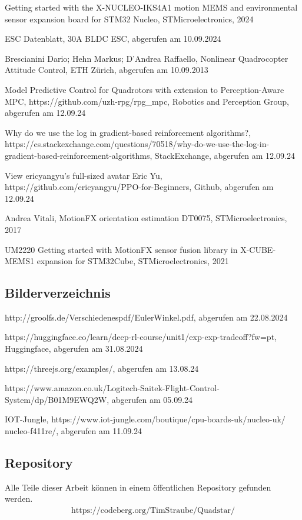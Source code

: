 \begin{enumerate}[label=\textbf{[\arabic*]}]
	\item \label{link:34} Getting started with the X-NUCLEO-IKS4A1 motion MEMS and environmental sensor expansion board for STM32 Nucleo, STMicroelectronics, 2024
	\item \label{link:Treiberdatenblatt}ESC Datenblatt, 30A BLDC ESC, abgerufen am 10.09.2024 
	\item \label{link:ETH}Brescianini Dario; Hehn Markus; D'Andrea Raffaello, Nonlinear Quadrocopter Attitude Control, ETH Zürich, abgerufen am 10.09.2013 
	\item \label{link:MPC} Model Predictive Control for Quadrotors with extension to Perception-Aware MPC, https://github.com/uzh-rpg/rpg\_mpc, Robotics and Perception Group, abgerufen am 12.09.24
	\item \label{link:LogPPO} Why do we use the log in gradient-based reinforcement algorithms?,\\ https://cs.stackexchange.com/questions/70518/why-do-we-use-the-log-in-gradient-based-reinforcement-algorithms, StackExchange, abgerufen am 12.09.24
	\item \label{link:PPOBeginner}View ericyangyu's full-sized avatar Eric Yu, https://github.com/ericyangyu/PPO-for-Beginners, Github, abgerufen am 12.09.24
	\item \label{link:MotionFX}Andrea Vitali, MotionFX orientation estimation DT0075, STMicroelectronics, 2017
	\item \label{X-CUBE-MEMS1} UM2220 Getting started with MotionFX sensor fusion library in X-CUBE-MEMS1
	expansion for STM32Cube, STMicroelectronics, 2021
\end{enumerate}

\subsection{Bilderverzeichnis}
\begin{enumerate}[label=\textbf{[\arabic*]}]
	\item \label{bild:1} http://groolfs.de/Verschiedenespdf/EulerWinkel.pdf, abgerufen am 22.08.2024
	\item \label{bild:2} https://huggingface.co/learn/deep-rl-course/unit1/exp-exp-tradeoff?fw=pt, Huggingface, abgerufen am 31.08.2024
	\item \label{bild:3} https://threejs.org/examples/, abgerufen am 13.08.24
	\item \label{bild:4} https://www.amazon.co.uk/Logitech-Saitek-Flight-Control-System/dp/B01M9EWQ2W, abgerufen am 05.09.24
	\item \label{bild:Pinout} IOT-Jungle, https://www.iot-jungle.com/boutique/cpu-boards-uk/nucleo-uk/\\nucleo-f411re/, abgerufen am 11.09.24
\end{enumerate}

\subsection{Repository}
Alle Teile dieser Arbeit können in einem öffentlichen Repository gefunden werden. 
\begin{align*}
	\text{https://codeberg.org/TimStraube/Quadstar/}
\end{align*}